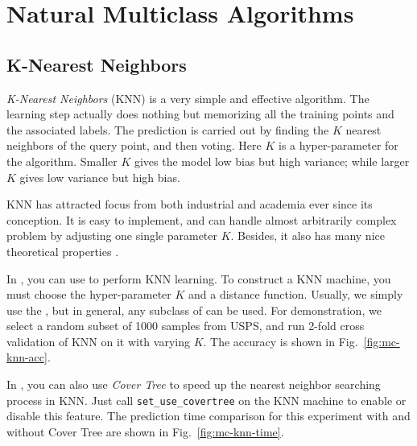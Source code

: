\section{Natural Multiclass Algorithms}
\label{sec:multiclass-natural}

\subsection{K-Nearest Neighbors}
\emph{K-Nearest Neighbors} (KNN) is a very simple and effective algorithm. The 
learning step actually does nothing but memorizing all the training points and 
the associated labels. The prediction is carried out by finding the $K$ 
nearest neighbors of the query point, and then voting.  Here $K$ is a 
hyper-parameter for the algorithm. Smaller $K$ gives the model low bias but 
high variance; while larger $K$ gives low variance but high bias.

KNN has attracted focus from both industrial and academia ever since its
conception. It is easy to implement, and can handle almost arbitrarily complex
problem by adjusting one single parameter $K$. Besides, it also has many nice
theoretical properties \citep{ProbTheoryofPR}.

In \shogun, you can use  to perform KNN learning. To
construct a KNN machine, you must choose the hyper-parameter $K$ and a distance
function. Usually, we simply use the , but in
general, any subclass of  can be used. For
demonstration, we select a random subset of 1000 samples from USPS, and run
2-fold cross validation of KNN on it with varying $K$. The accuracy is shown in
Fig.~\ref{fig:mc-knn-acc}.

In \shogun{}, you can also use \emph{Cover Tree} \citep{CoverTree} to speed up
the nearest neighbor searching process in KNN. Just call \Verb|set_use_covertree| on
the KNN machine to enable or disable this feature. The prediction time
comparison for this experiment with and without Cover Tree are shown in
Fig.~\ref{fig:mc-knn-time}.

